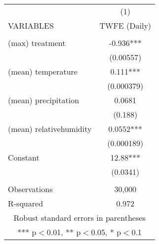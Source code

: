 \begin{tabular}{lc} \hline
 & (1) \\
VARIABLES & TWFE (Daily) \\ \hline
 &  \\
(max) treatment & -0.936*** \\
 & (0.00557) \\
(mean) temperature & 0.111*** \\
 & (0.000379) \\
(mean) precipitation & 0.0681 \\
 & (0.188) \\
(mean) relativehumidity & 0.0552*** \\
 & (0.000189) \\
Constant & 12.88*** \\
 & (0.0341) \\
 &  \\
Observations & 30,000 \\
 R-squared & 0.972 \\ \hline
\multicolumn{2}{c}{ Robust standard errors in parentheses} \\
\multicolumn{2}{c}{ *** p$<$0.01, ** p$<$0.05, * p$<$0.1} \\
\end{tabular}
